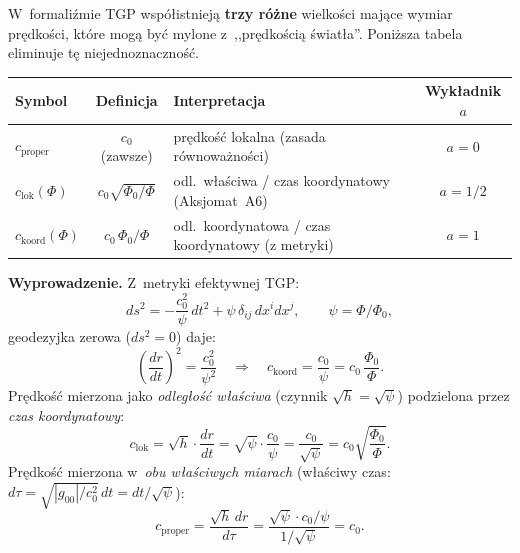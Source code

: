 
\begin{remark}%
\label{rem:three-speeds}

W~formaliźmie TGP współistnieją \textbf{trzy różne} wielkości
mające wymiar prędkości, które mogą być mylone z~,,prędkością
światła''. Poniższa tabela eliminuje tę niejednoznaczność.

\medskip
\begin{center}\small
\begin{tabular}{@{}lclc@{}}
\toprule
\textbf{Symbol} & \textbf{Definicja} & \textbf{Interpretacja}
  & \textbf{Wykładnik $a$} \\
\midrule
$c_{\mathrm{proper}}$ & $c_0$ (zawsze)
  & prędkość lokalna (zasada równoważności)
  & $a = 0$ \\[3pt]
$c_{\mathrm{lok}}(\Phi)$ & $c_0\sqrt{\Phi_0/\Phi}$
  & odl.~właściwa / czas koordynatowy (Aksjomat~A6)
  & $a = 1/2$ \\[3pt]
$c_{\mathrm{koord}}(\Phi)$ & $c_0\,\Phi_0/\Phi$
  & odl.~koordynatowa / czas koordynatowy (z metryki)
  & $a = 1$ \\
\bottomrule
\end{tabular}
\end{center}
\medskip

\noindent\textbf{Wyprowadzenie.}
Z~metryki efektywnej TGP:
\begin{equation}
  ds^2 = -\frac{c_0^2}{\psi}\,dt^2 + \psi\,\delta_{ij}\,dx^i dx^j,
  \qquad \psi = \Phi/\Phi_0,
\end{equation}
geodezyjka zerowa ($ds^2 = 0$) daje:
\begin{equation}
  \left(\frac{dr}{dt}\right)^2
  = \frac{c_0^2}{\psi^2}
  \quad\Rightarrow\quad
  c_{\mathrm{koord}} = \frac{c_0}{\psi} = c_0\,\frac{\Phi_0}{\Phi}.
\end{equation}
Prędkość mierzona jako \emph{odległość właściwa} (czynnik $\sqrt{h} = \sqrt{\psi}$)
podzielona przez \emph{czas koordynatowy}:
\begin{equation}
  c_{\mathrm{lok}} = \sqrt{h}\cdot\frac{dr}{dt}
  = \sqrt{\psi}\cdot\frac{c_0}{\psi}
  = \frac{c_0}{\sqrt{\psi}}
  = c_0\sqrt{\frac{\Phi_0}{\Phi}}.
\end{equation}
Prędkość mierzona w~\emph{obu właściwych miarach}
(właściwy czas: $d\tau = \sqrt{|g_{00}|/c_0^2}\,dt = dt/\sqrt{\psi}$):
\begin{equation}
  c_{\mathrm{proper}}
  = \frac{\sqrt{h}\,dr}{d\tau}
  = \frac{\sqrt{\psi}\cdot c_0/\psi}{1/\sqrt{\psi}}
  = c_0.
\end{equation}


\end{remark}
